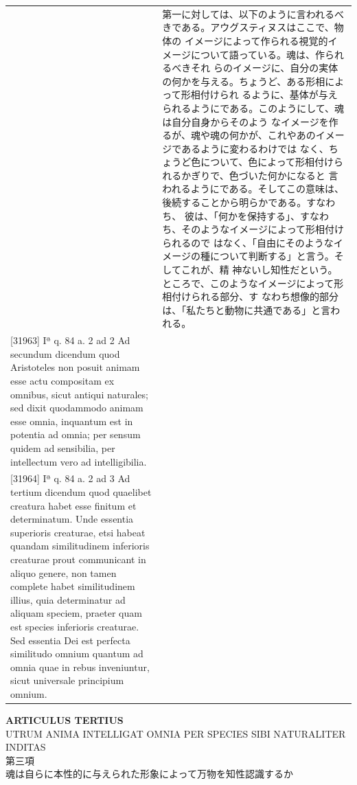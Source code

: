 \documentclass[paper=a4paper,fontsize=10pt,jafontsize=9pt,titlepage]{jlreq}
\begin{document}
\begin{longtable}{p{21em}p{21em}}
&

第一に対しては、以下のように言われるべきである。アウグスティヌスはここで、物体の
イメージによって作られる視覚的イメージについて語っている。魂は、作られるべきそれ
らのイメージに、自分の実体の何かを与える。ちょうど、ある形相によって形相付けられ
るように、基体が与えられるようにである。このようにして、魂は自分自身からそのよう
なイメージを作るが、魂や魂の何かが、これやあのイメージであるように変わるわけでは
なく、ちょうど色について、色によって形相付けられるかぎりで、色づいた何かになると
言われるようにである。そしてこの意味は、後続することから明らかである。すなわち、
彼は、「何かを保持する」、すなわち、そのようなイメージによって形相付けられるので
はなく、「自由にそのようなイメージの種について判断する」と言う。そしてこれが、精
神ないし知性だという。ところで、このようなイメージによって形相付けられる部分、す
なわち想像的部分は、「私たちと動物に共通である」と言われる。

 

\\[1em]


[31963] Iª q. 84 a. 2 ad 2
Ad secundum dicendum quod Aristoteles non posuit animam esse actu compositam ex omnibus, sicut antiqui naturales; sed dixit quodammodo animam esse omnia, inquantum est in potentia ad omnia; per sensum quidem ad sensibilia, per intellectum vero ad intelligibilia.

&



\\[1em]


[31964] Iª q. 84 a. 2 ad 3
Ad tertium dicendum quod quaelibet creatura habet esse finitum et determinatum. Unde essentia superioris creaturae, etsi habeat quandam similitudinem inferioris creaturae prout communicant in aliquo genere, non tamen complete habet similitudinem illius, quia determinatur ad aliquam speciem, praeter quam est species inferioris creaturae. Sed essentia Dei est perfecta similitudo omnium quantum ad omnia quae in rebus inveniuntur, sicut universale principium omnium.

&



\end{longtable}
\newpage






\begin{center}
{\Large {\bfseries ARTICULUS TERTIUS}}\\
{\large UTRUM ANIMA INTELLIGAT OMNIA PER SPECIES SIBI NATURALITER INDITAS}\\
{\Large 第三項\\魂は自らに本性的に与えられた形象によって万物を知性認識するか}
\end{center}
\end{document}
